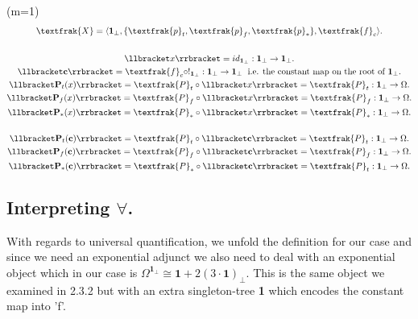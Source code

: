 \begin{ex} (m=1)
	\begin{gather*}
			\textfrak{X}= \langle \textbf{1}_\bot, \{\textfrak{p}_t, \textfrak{p}_f, \textfrak{p}_*\}, \textfrak{f}_c \rangle. \\ \\
			\llbracket x \rrbracket = id_{\textbf{1}_\bot}: \textbf{1}_\bot \rightarrow \textbf{1}_\bot. \\
			\llbracket \textbf{c} \rrbracket = \textfrak{f}_c \circ !_{\textbf{1}_\bot} : \textbf{1}_\bot \rightarrow \textbf{1}_\bot \; \text{ i.e. the constant map on the root of $\textbf{1}_\bot$}.  \\
			\llbracket \textbf{P}_t (x) \rrbracket = \textfrak{P}_t \circ \llbracket x \rrbracket = \textfrak{P}_t : \textbf{1}_\bot \rightarrow \Omega.\\
			\llbracket \textbf{P}_f (x) \rrbracket = \textfrak{P}_f \circ \llbracket x \rrbracket = \textfrak{P}_f : \textbf{1}_\bot \rightarrow \Omega.\\
			\llbracket \textbf{P}_* (x) \rrbracket = \textfrak{P}_* \circ \llbracket x \rrbracket = \textfrak{P}_* : \textbf{1}_\bot \rightarrow \Omega. \\
			\\
			\llbracket \textbf{P}_t (\textbf{c}) \rrbracket = \textfrak{P}_t \circ \llbracket \textbf{c} \rrbracket = \textfrak{P}_t : \textbf{1}_\bot \rightarrow \Omega.\\
			\llbracket \textbf{P}_f (\textbf{c}) \rrbracket = \textfrak{P}_f \circ \llbracket \textbf{c} \rrbracket = \textfrak{P}_f : \textbf{1}_\bot \rightarrow \Omega.\\
			\llbracket \textbf{P}_* (\textbf{c}) \rrbracket = \textfrak{P}_* \circ \llbracket \textbf{c} \rrbracket = \textfrak{P}_t : \textbf{1}_\bot \rightarrow \Omega. 
		\end{gather*}
\end{ex}
\newpage

\subsection{Interpreting $\forall$.}

With regards to universal quantification, we unfold the definition for our case and since we need an exponential adjunct we also need to deal with an exponential object which in our case is $\Omega^{\textbf{1}_\bot} \cong \textbf{1} + 2(3 \cdot \textbf{1})_\bot $. \newline
This is the same object we examined in 2.3.2 but with an extra singleton-tree \textbf{1} which encodes the constant map into 'f'.



